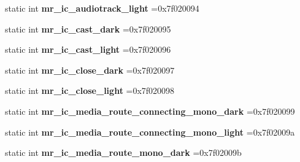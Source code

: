 \begin{DoxyCompactItemize}
static int {\bfseries mr\+\_\+ic\+\_\+audiotrack\+\_\+light} =0x7f020094
\item 
\mbox{\label{classandroid_1_1support_1_1v7_1_1cardview_1_1R_1_1drawable_a502a9c272b7121cf2cd570814240da07}} 
static int {\bfseries mr\+\_\+ic\+\_\+cast\+\_\+dark} =0x7f020095
\item 
\mbox{\label{classandroid_1_1support_1_1v7_1_1cardview_1_1R_1_1drawable_a3069cae467ee11a18fda3de1c9050c33}} 
static int {\bfseries mr\+\_\+ic\+\_\+cast\+\_\+light} =0x7f020096
\item 
\mbox{\label{classandroid_1_1support_1_1v7_1_1cardview_1_1R_1_1drawable_a36a372467e7d71ea24ba8dd7549f3dd2}} 
static int {\bfseries mr\+\_\+ic\+\_\+close\+\_\+dark} =0x7f020097
\item 
\mbox{\label{classandroid_1_1support_1_1v7_1_1cardview_1_1R_1_1drawable_a43c8201711e4b5ddbe33a33a17e5aba0}} 
static int {\bfseries mr\+\_\+ic\+\_\+close\+\_\+light} =0x7f020098
\item 
\mbox{\label{classandroid_1_1support_1_1v7_1_1cardview_1_1R_1_1drawable_a437be32c2f73a1e364c763d12c7d8029}} 
static int {\bfseries mr\+\_\+ic\+\_\+media\+\_\+route\+\_\+connecting\+\_\+mono\+\_\+dark} =0x7f020099
\item 
\mbox{\label{classandroid_1_1support_1_1v7_1_1cardview_1_1R_1_1drawable_a04f93d9b16c09aaba3a57c7641dd3573}} 
static int {\bfseries mr\+\_\+ic\+\_\+media\+\_\+route\+\_\+connecting\+\_\+mono\+\_\+light} =0x7f02009a
\item 
\mbox{\label{classandroid_1_1support_1_1v7_1_1cardview_1_1R_1_1drawable_aa20191bae1437cda7dfc1263de1225ec}} 
static int {\bfseries mr\+\_\+ic\+\_\+media\+\_\+route\+\_\+mono\+\_\+dark} =0x7f02009b
\item 
\mbox{\label{classandroid_1_1support_1_1v7_1_1cardview_1_1R_1_1drawable_ae66f437679ee88ab4648bcae8d5bd9de}} 

\end{DoxyCompactItemize}
